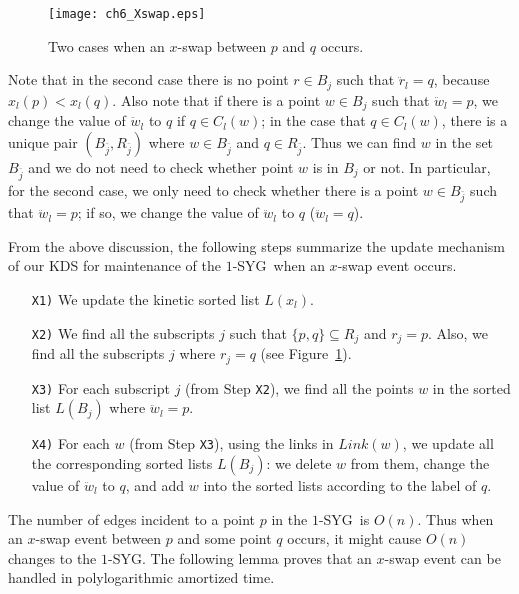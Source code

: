\documentclass[preprint,12pt]{elsarticle}
\def\1syg{\mbox{$1$-SYG}}
\begin{document}
\begin{figure}[t]
\centering
\texttt{[image: ch6\_Xswap.eps]}
\caption{Two cases when an $x$-swap between $p$ and $q$ occurs.}
\label{fig:Xswap}
\end{figure}

Note that in the second case there is no point $r\in B_j$ such that $\ddot{r}_l=q$, because $x_l(p)<x_l(q)$. Also note that if there is a point $w\in B_j$ such that $\ddot{w}_l=p$, we change the value of $\ddot{w}_l$ to $q$ if $q\in C_l(w)$; in the case that $q\in C_l(w)$, there is a unique pair $(B_{\bar{j}},R_{\bar{j}})$ where $w\in B_{\bar{j}}$ and $q\in R_{\bar{j}}$. Thus we can find $w$ in the set $B_{\bar{j}}$ and we do not need to check whether point $w$ is in $B_j$ or not. In particular, for the second case, we only need to check whether there is a point $w\in B_{\bar{j}}$ such that $\ddot{w}_l=p$; if so, we change the value of $\ddot{w}_l$ to $q$ ($\ddot{w}_l=q$).

From the above discussion, the following steps summarize the update mechanism of our KDS for maintenance of the \1syg~when an $x$-swap event occurs.

\begin{itemize}
\item[\texttt{X1)}] We update the kinetic sorted list $L(x_l)$.
\item[\texttt{X2)}] We find all the subscripts $j$ such that $\{p,q\}\subseteq R_j$ and $r_j=p$. Also, we find all the subscripts $j$ where $r_j=q$ (see Figure~\ref{fig:Xswap}).
\item[\texttt{X3)}] For each subscript $j$ (from Step \texttt{X2}), we find all the points $w$ in the sorted list $L(B_j)$ where $\ddot{w}_l=p$.
\item[\texttt{X4)}] For each $w$ (from Step \texttt{X3}), using the links in $Link(w)$, we update all the corresponding sorted lists $L(B_j)$: we delete $w$ from them, change the value of $\ddot{w}_l$ to $q$, and add $w$ into the sorted lists according to the label of $q$.
\end{itemize}

The number of edges incident to a point $p$ in the \1syg~is $O(n)$. Thus when an $x$-swap event between $p$ and some point $q$ occurs, it might cause $O(n)$ changes to the \1syg. The following lemma proves that an $x$-swap event can be handled in polylogarithmic amortized time.
\end{document}
